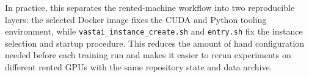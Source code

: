 In practice, this separates the rented-machine workflow into two reproducible layers: the selected Docker image fixes the CUDA and Python tooling environment, while \verb|vastai_instance_create.sh| and \verb|entry.sh| fix the instance selection and startup procedure. This reduces the amount of hand configuration needed before each training run and makes it easier to rerun experiments on different rented GPUs with the same repository state and data archive.
